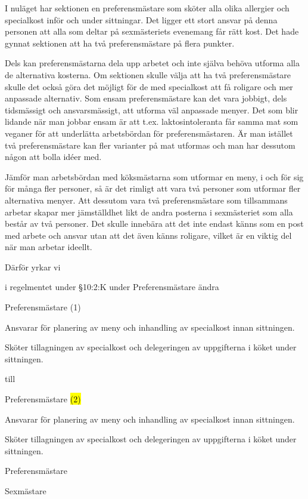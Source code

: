 \documentclass[../_main/handlingar.tex]{subfiles}
\begin{document}

I nuläget har sektionen en preferensmästare som sköter alla olika allergier och specialkost inför och under sittningar. Det ligger ett stort ansvar på denna personen att alla som deltar på sexmästeriets evenemang får rätt kost. Det hade gynnat sektionen att ha två preferensmästare på flera punkter. 

Dels kan preferensmästarna dela upp arbetet och inte själva behöva utforma alla de alternativa kosterna. Om sektionen skulle välja att ha två preferensmästare skulle det också göra det möjligt för de med specialkost att få roligare och mer anpassade alternativ. Som ensam preferensmästare kan det vara jobbigt, dels tidsmässigt och ansvarsmässigt, att utforma väl anpassade menyer. Det som blir lidande när man jobbar ensam är att t.ex. laktosintoleranta får samma mat som veganer för att underlätta arbetsbördan för preferensmästaren. Är man istället två preferensmästare kan fler varianter på mat utformas och man har dessutom någon att bolla idéer med. 

Jämför man arbetsbördan med köksmästarna som utformar en meny, i och för sig för många fler personer, så är det rimligt att vara två personer som utformar fler alternativa menyer. Att dessutom vara två preferensmästare som tillsammans arbetar skapar mer jämställdhet likt de andra posterna i sexmästeriet som alla består av två personer. Det skulle innebära att det inte endast känns som en post med arbete och ansvar utan att det även känns roligare, vilket är en viktig del när man arbetar ideellt.


Därför yrkar vi
\begin{attsatser}

    \att i regelmentet under \S10:2:K under Preferensmästare ändra \par
    \begin{emptylist}
        \item Preferensmästare (1)
        \begin{dashlist}
            \item Ansvarar för planering av meny och inhandling av specialkost innan sittningen.
            \item Sköter tillagningen av specialkost och delegeringen av uppgifterna i köket under sittningen.
        \end{dashlist}
    \end{emptylist}

    till 

    \begin{emptylist}
        \item Preferensmästare \hl{(2)}
        \begin{dashlist}
            \item Ansvarar för planering av meny och inhandling av specialkost innan sittningen.
            \item Sköter tillagningen av specialkost och delegeringen av uppgifterna i köket under sittningen.
        \end{dashlist}
        \changenote
    \end{emptylist}

\end{attsatser}


\begin{signatures}{2}
    \isekt
    \signature{Silke Kylberg}{Preferensmästare}
    \signature{\sexm}{Sexmästare}
\end{signatures}
\end{document}
